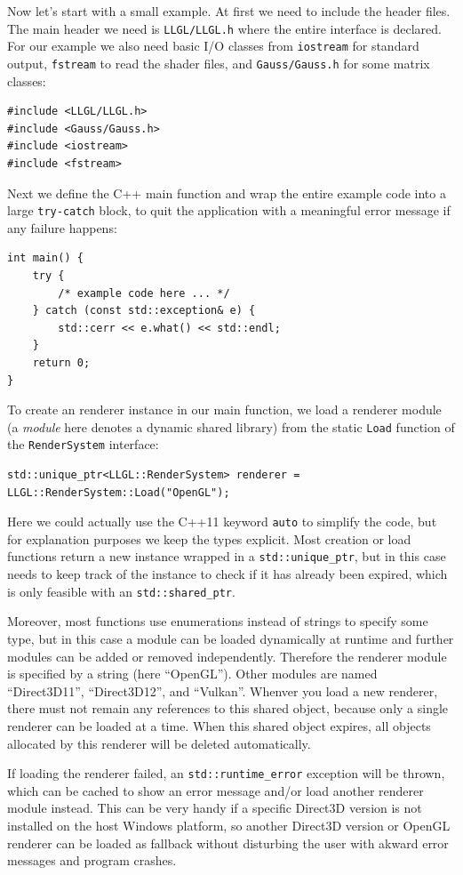 \documentclass{article}
\begin{document}
Now let's start with a small example. At first we need to include the header files.
The main header we need is \texttt{LLGL/LLGL.h} where the entire \LLGL interface is declared.
For our example we also need basic I/O classes from \texttt{iostream} for standard output, \texttt{fstream}
to read the shader files, and \texttt{Gauss/Gauss.h} for some matrix classes:
\begin{lstlisting}
#include <LLGL/LLGL.h>
#include <Gauss/Gauss.h>
#include <iostream>
#include <fstream>
\end{lstlisting}
Next we define the C++ main function and wrap the entire example code into a large \texttt{try-catch} block,
to quit the application with a meaningful error message if any failure happens:
\begin{lstlisting}
int main() {
    try {
        /* example code here ... */
    } catch (const std::exception& e) {
        std::cerr << e.what() << std::endl;
    }
    return 0;
}
\end{lstlisting}
To create an \LLGL renderer instance in our main function, we load a renderer module
(a \textit{module} here denotes a dynamic shared library)
from the static \texttt{Load} function of the \texttt{RenderSystem} interface:
\begin{lstlisting}
std::unique_ptr<LLGL::RenderSystem> renderer = LLGL::RenderSystem::Load("OpenGL");
\end{lstlisting}
Here we could actually use the C++11 keyword \texttt{auto} to simplify the code,
but for explanation purposes we keep the types explicit.
Most creation or load functions return a new instance wrapped in a \texttt{std::unique\_ptr},
but in this case \LLGL needs to keep track of the instance to check if it has already been expired,
which is only feasible with an \texttt{std::shared\_ptr}.

Moreover, most functions use enumerations instead of strings to specify some type, but in this case
a module can be loaded dynamically at runtime and further modules can be added or removed independently.
Therefore the renderer module is specified by a string (here ``OpenGL''). Other modules are
named ``Direct3D11'', ``Direct3D12'', and ``Vulkan''.
Whenver you load a new renderer, there must not remain any references to this shared object,
because only a single renderer can be loaded at a time.
When this shared object expires, all objects allocated by this renderer will be deleted automatically.

If loading the renderer failed, an \texttt{std::runtime\_error} exception will be thrown,
which can be cached to show an error message and/or load another renderer module instead.
This can be very handy if a specific Direct3D version is not installed on the host Windows platform,
so another Direct3D version or OpenGL renderer can be loaded as fallback
without disturbing the user with akward error messages and program crashes.
\end{document}
